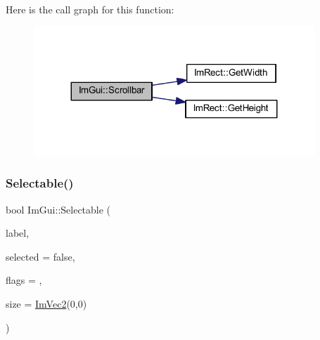Here is the call graph for this function\+:
\nopagebreak
\begin{figure}[H]
\begin{center}
\leavevmode
\includegraphics[width=299pt]{namespace_im_gui_abf1d7a83c5f0a555bbe7f831b0319c8a_cgraph}
\end{center}
\end{figure}
\mbox{\label{namespace_im_gui_af98575238bda183a523df19fb447af60}} 
\subsubsection{\texorpdfstring{Selectable()}{Selectable()}\hspace{0.1cm}{\footnotesize\ttfamily [1/2]}}
{\footnotesize\ttfamily bool Im\+Gui\+::\+Selectable (\begin{DoxyParamCaption}\item[{const char $\ast$}]{label,  }\item[{bool}]{selected = {\ttfamily false},  }\item[{\mbox{\hyperlink{imgui_8h_aab0fe56421d75949dedfbfbbaa674b6b}{Im\+Gui\+Selectable\+Flags}}}]{flags = {},  }\item[{const \mbox{\hyperlink{struct_im_vec2}{Im\+Vec2}} \&}]{size = {\ttfamily \mbox{\hyperlink{struct_im_vec2}{Im\+Vec2}}(0,0)} }\end{DoxyParamCaption})}

